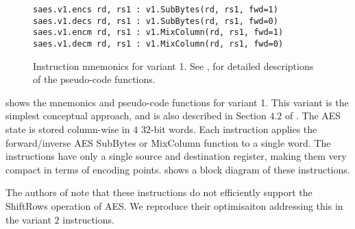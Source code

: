 
\begin{figure}
\begin{lstlisting}[language=pseudo,style=block]
saes.v1.encs rd, rs1 : v1.SubBytes(rd, rs1, fwd=1)
saes.v1.decs rd, rs1 : v1.SubBytes(rd, rs1, fwd=0)
saes.v1.encm rd, rs1 : v1.MixColumn(rd, rs1, fwd=1)
saes.v1.decm rd, rs1 : v1.MixColumn(rd, rs1, fwd=0)
\end{lstlisting}
\caption{
    Instruction mnemonics for variant 1.
    See ,  for detailed
    descriptions of the pseudo-code functions.
}
\label{fig:mnemonics:v1}
\end{figure}

 shows the mnemonics and pseudo-code functions
for variant 1.
This variant is the simplest conceptual approach, and
is also described in Section $4.2$ of \cite{TilGro:06}.
The AES state is stored column-wise in $4$ $32$-bit words.
Each instruction applies the forward/inverse AES SubBytes or
MixColumn function to a single word.
The instructions have only a single source and destination register,
making them very compact in terms of encoding points.
 shows a block diagram of these
instructions.

The authors of \cite{TilGro:06} note that these instructions do not
efficiently support the ShiftRows operation of AES.  We reproduce their
optimisaiton addressing this in the variant $2$ instructions.

